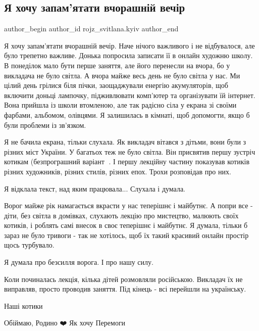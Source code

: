  
 
 
 
 

\subsection{Я хочу запам'ятати вчорашній вечір}
\label{sec:11_01_2023.fb.rojz_svitlana.kyiv.1.ya_khochu_zapam_yata}

\ifcmt
 author_begin
   author_id rojz_svitlana.kyiv
 author_end
\fi

Я хочу запам'ятати вчорашній вечір. Наче нічого важливого і не відбувалося, але
було трепетно важливе. Донька попросила записати її в онлайн художню школу. В
понеділок мало бути перше заняття, але його перенесли на вчора, бо у викладача
не було світла. А вчора майже весь день не було світла у нас. Ми цілий день
грілися біля пічки, заощаджували енергію акумуляторів, щоб включити доньці
лампочку, підживлювати комп'ютер та організувати їй інтернет. Вона прийшла із
школи втомленою, але так радісно  сіла у екрана зі своїми фарбами, альбомом,
олівцями. Я залишилась в кімнаті, щоб допомогти, якщо б були проблеми із
зв'язком. 

Я не бачила екрана, тільки слухала. Як викладач вітався з дітьми, вони були з
різних міст України.  У багатьох теж не було світла. Він присвятив першу
зустріч котикам (безпрограшний варіант 🙂. І першу лекційну частину  показував
котиків різних художників, різних стилів, різних епох. Трохи розповідав про
них. 

Я відклала текст, над яким працювала... Слухала і думала. 

Ворог майже рік намагається вкрасти у нас теперішнє і майбутнє. А попри все -
діти, без світла в домівках, слухають лекцію про мистецтво, малюють своїх
котиків, і роблять самі внесок в своє теперішнє і майбутнє. Я думала, тільки б
зараз не було тривоги - так не хотілось, щоб їх такий красивий онлайн простір
щось турбувало.

Я думала про безсилля ворога. І про нашу силу. 

Коли починалась лекція, кілька дітей розмовляли російською. Викладач їх не
виправляв, просто проводив заняття. Під кінець - всі перейшли на українську. 

Наші котики

Обіймаю, Родино ❤️ Як хочу Перемоги
